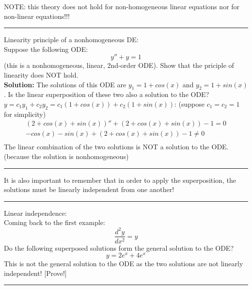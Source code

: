 NOTE: this theory does not hold for non-homogeneous linear equations nor for non-linear equations!!!

\begin{center}
\noindent\rule{4cm}{0.4pt}
\end{center}

\begin{exmp}{Linearity principle of a nonhomogeneous DE:}\\
Suppose the following ODE:
\begin{equation*}
y''+y=1
\end{equation*}
(this is a nonhomogeneous, linear, 2nd-order ODE).
Show that the priciple of linearity does NOT hold.\\
\textbf{Solution:}
The solutions of this ODE are $y_1=1+cos(x)$ and $y_2=1+sin(x)$. Is the linear superposition of these two also a solution to the ODE?\\
$y=c_1 y_1 + c_2 y_2 = c_1(1+cos(x))+c_2(1+sin(x))$:
(suppose $c_1=c_2=1$ for simplicity)
\begin{eqnarray*}
(2+cos(x)+sin(x))''+(2+cos(x)+sin(x))-1=0\\
-cos(x)-sin(x)+(2+cos(x)+sin(x))-1\neq 0\\
\end{eqnarray*}
The linear combination of the two solutions is NOT a solution to the ODE. (because the solution is nonhomogeneous)
\end{exmp}

\begin{center}
\noindent\rule{4cm}{0.4pt}
\end{center}


It is also important to remember that in order to apply the superposition, the solutions must be linearly independent from one another!

\begin{center}
\noindent\rule{4cm}{0.4pt}
\end{center}
\begin{exmp}{Linear independence:}\\
Coming back to the first example:
\begin{equation*}
\frac{d^2 y}{dx^2}=y
\end{equation*}
Do the following superposed solutions form the general solution to the ODE?
\begin{equation*}
y=2 e^x+ 4 e^x
\end{equation*}
This is not the general solution to the ODE as the two solutions are not linearly independent!
[Prove!]
\end{exmp}
\begin{center}
\noindent\rule{4cm}{0.4pt}
\end{center}

